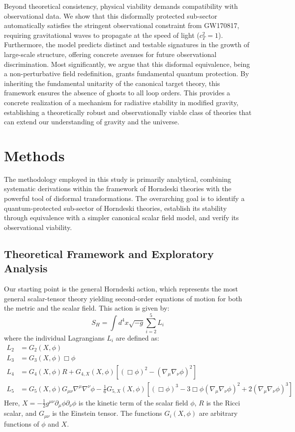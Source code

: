 \documentclass[twocolumn]{aastex631}
\begin{document}
Beyond theoretical consistency, physical viability demands compatibility with observational data. We show that this disformally protected sub-sector automatically satisfies the stringent observational constraint from GW170817, requiring gravitational waves to propagate at the speed of light ($c_T^2=1$). Furthermore, the model predicts distinct and testable signatures in the growth of large-scale structure, offering concrete avenues for future observational discrimination. Most significantly, we argue that this disformal equivalence, being a non-perturbative field redefinition, grants fundamental quantum protection. By inheriting the fundamental unitarity of the canonical target theory, this framework ensures the absence of ghosts to all loop orders. This provides a concrete realization of a mechanism for radiative stability in modified gravity, establishing a theoretically robust and observationally viable class of theories that can extend our understanding of gravity and the universe.


\section{Methods}
\label{sec:methods}
The methodology employed in this study is primarily analytical, combining systematic derivations within the framework of Horndeski theories with the powerful tool of disformal transformations. The overarching goal is to identify a quantum-protected sub-sector of Horndeski theories, establish its stability through equivalence with a simpler canonical scalar field model, and verify its observational viability.

\subsection{Theoretical Framework and Exploratory Analysis}
Our starting point is the general Horndeski action, which represents the most general scalar-tensor theory yielding second-order equations of motion for both the metric and the scalar field. This action is given by:
\begin{equation}
S_H = \int d^4x \sqrt{-g} \sum_{i=2}^{5} L_i
\end{equation}
where the individual Lagrangians $L_i$ are defined as:
\begin{align*}
L_2 &= G_2(X, \phi) \\
L_3 &= G_3(X, \phi) \Box\phi \\
L_4 &= G_4(X, \phi) R + G_{4,X}(X, \phi) [(\Box\phi)^2 - (\nabla_\mu\nabla_\nu\phi)^2] \\
L_5 &= G_5(X, \phi) G_{\mu\nu} \nabla^\mu\nabla^\nu\phi - \frac{1}{6} G_{5,X}(X, \phi) [(\Box\phi)^3 - 3\Box\phi(\nabla_\mu\nabla_\nu\phi)^2 + 2(\nabla_\mu\nabla_\nu\phi)^3]
\end{align*}
Here, $X = -\frac{1}{2} g^{\mu\nu}\partial_\mu\phi\partial_\nu\phi$ is the kinetic term of the scalar field $\phi$, $R$ is the Ricci scalar, and $G_{\mu\nu}$ is the Einstein tensor. The functions $G_i(X, \phi)$ are arbitrary functions of $\phi$ and $X$.
\end{document}
